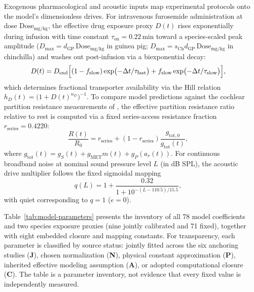 \documentclass[final,5p,times]{elsarticle}
\begin{document}
Exogenous pharmacological and acoustic inputs map experimental protocols onto the model's dimensionless drives. For intravenous furosemide administration at dose \(\mathrm{Dose}_{\mathrm{mg/kg}}\), the effective drug exposure proxy \(D(t)\) rises exponentially during infusion with time constant \(\tau_{\mathrm{on}} = 0.22\,\mathrm{min}\) toward a species-scaled peak amplitude (\(D_{\max} = d_{\mathrm{GP}}\,\mathrm{Dose}_{\mathrm{mg/kg}}\) in guinea pig; \(D_{\max} = s_{\mathrm{Ch}} d_{\mathrm{GP}}\,\mathrm{Dose}_{\mathrm{mg/kg}}\) in chinchilla) and washes out post-infusion via a biexponential decay:
\begin{equation}
  D(t) = D_{\mathrm{end}}\Bigl[(1 - f_{\mathrm{slow}})\exp\bigl(-\Delta t / \tau_{\mathrm{fast}}\bigr) + f_{\mathrm{slow}}\exp\bigl(-\Delta t / \tau_{\mathrm{slow}}\bigr)\Bigr],
  \label{eq:drug-washout}
\end{equation}
which determines fractional transporter availability via the Hill relation \(h_D(t) = \bigl(1 + D(t)^{n_D}\bigr)^{-1}\). To compare model predictions against the cochlear partition resistance measurements of \citet{AsakumaSnow1980}, the effective partition resistance ratio relative to rest is computed via a fixed series-access resistance fraction \(r_{\mathrm{series}} = 0.4220\):
\begin{equation}
  \frac{R(t)}{R_0} = r_{\mathrm{series}} + (1 - r_{\mathrm{series}})\frac{g_{\mathrm{tot},0}}{g_{\mathrm{tot}}(t)},
  \label{eq:res-ratio}
\end{equation}
where \(g_{\mathrm{tot}}(t) = g_S(t) + g_{\mathrm{MET}}m(t) + g_P(a_r(t))\). For continuous broadband noise at nominal sound pressure level \(L\) (in dB SPL), the acoustic drive multiplier follows the fixed sigmoidal mapping
\begin{equation}
  q(L) = 1 + \frac{0.32}{1 + 10^{-(L - 110.5)/15.5}},
  \label{eq:sound-map}
\end{equation}
with quiet corresponding to \(q = 1\) (\(e = 0\)).

Table~\ref{tab:model-parameters} presents the inventory of all 78 model coefficients and two species exposure proxies (nine jointly calibrated and 71 fixed), together with eight embedded closure and mapping constants. For transparency, each parameter is classified by source status: jointly fitted across the six anchoring studies (\textbf{J}), chosen normalization (\textbf{N}), physical constant approximation (\textbf{P}), inherited effective modeling assumption (\textbf{A}), or adopted computational closure (\textbf{C}). The table is a parameter inventory, not evidence that every fixed value is independently measured.
\end{document}
